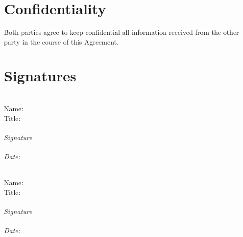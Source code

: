 \documentclass[12pt]{article}
\begin{document}
\section{Confidentiality}
Both parties agree to keep confidential all information received from the other party in the course of this Agreement.

\section{Signatures}
\vspace{2em}

\noindent
\begin{minipage}[t]{0.47\textwidth}
\textbf{\partyAshort}\\[1em]
Name:\ \partyAcontact\\
Title:\ \partyAtitle\\[3em]
\makebox[6cm]{\hrulefill}\\[-0.3em]
\textit{Signature}\\[1em]
\makebox[6cm]{\hrulefill}\\[-0.3em]
\textit{Date: \sigDate}
\end{minipage}
\hfill
\begin{minipage}[t]{0.47\textwidth}
\textbf{\partyBshort}\\[1em]
Name:\ \partyBcontact\\
Title:\ \partyBtitle\\[3em]
\makebox[6cm]{\hrulefill}\\[-0.3em]
\textit{Signature}\\[1em]
\makebox[6cm]{\hrulefill}\\[-0.3em]
\textit{Date: \sigDate}
\end{minipage}


\vspace{1em}
\end{document}
